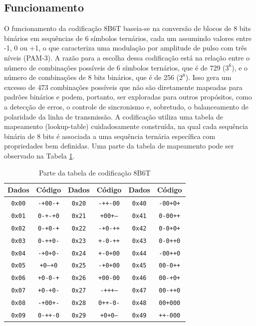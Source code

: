 \documentclass[conference]{IEEEtran}
\begin{document}
\subsection{Funcionamento}

O funcionamento da codificação 8B6T baseia-se na conversão de blocos de 8 bits binários em sequências de 6 símbolos ternários, cada um assumindo valores entre -1, 0 ou +1, o que caracteriza uma modulação por amplitude de pulso com três níveis (PAM-3). A razão para a escolha dessa codificação está na relação entre o número de combinações possíveis de 6 símbolos ternários, que é de 729 (\(3^6\)), e o número de combinações de 8 bits binários, que é de 256 (\(2^8\)). Isso gera um excesso de 473 combinações possíveis que não são diretamente mapeadas para padrões binários e podem, portanto, ser exploradas para outros propósitos, como a detecção de erros, o controle de sincronismo e, sobretudo, o balanceamento de polaridade da linha de transmissão. A codificação utiliza uma tabela de mapeamento (lookup-table) cuidadosamente construída, na qual cada sequência binária de 8 bits é associada a uma sequência ternária específica com propriedades bem definidas. Uma parte da tabela de mapeamento pode ser observado na Tabela \ref{tab:8b6t}.

\begin{table}[ht]
\centering
\caption{Parte da tabela de codificação 8B6T}
\renewcommand{\arraystretch}{1.2}
\setlength{\tabcolsep}{6pt}
\begin{tabular}{cc|cc|cc}
\toprule
\textbf{Dados} & \textbf{Código} & \textbf{Dados} & \textbf{Código} & \textbf{Dados} & \textbf{Código} \\
\midrule
\texttt{0x00} & \texttt{-+00-+} & \texttt{0x20} & \texttt{-++-00} & \texttt{0x40} & \texttt{-00+0+} \\
\texttt{0x01} & \texttt{0-+-+0} & \texttt{0x21} & \texttt{+00+--} & \texttt{0x41} & \texttt{0-00++} \\
\texttt{0x02} & \texttt{0-+0-+} & \texttt{0x22} & \texttt{-+0-++} & \texttt{0x42} & \texttt{0-0+0+} \\
\texttt{0x03} & \texttt{0-++0-} & \texttt{0x23} & \texttt{+-0-++} & \texttt{0x43} & \texttt{0-0++0} \\
\texttt{0x04} & \texttt{-+0+0-} & \texttt{0x24} & \texttt{+-0+00} & \texttt{0x44} & \texttt{-00++0} \\
\texttt{0x05} & \texttt{+0--+0} & \texttt{0x25} & \texttt{-+0+00} & \texttt{0x45} & \texttt{00-0++} \\
\texttt{0x06} & \texttt{+0-0-+} & \texttt{0x26} & \texttt{+00-00} & \texttt{0x46} & \texttt{00-+0+} \\
\texttt{0x07} & \texttt{+0-+0-} & \texttt{0x27} & \texttt{-+++--} & \texttt{0x47} & \texttt{00-++0} \\
\texttt{0x08} & \texttt{-+00+-} & \texttt{0x28} & \texttt{0++-0-} & \texttt{0x48} & \texttt{00+000} \\
\texttt{0x09} & \texttt{0-++-0} & \texttt{0x29} & \texttt{+0+0--} & \texttt{0x49} & \texttt{++-000} \\
\bottomrule
\end{tabular}
\label{tab:8b6t}
\end{table}
\end{document}
